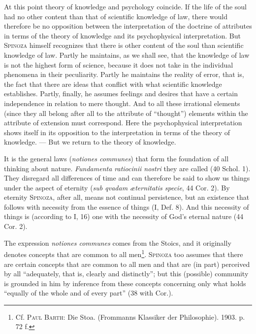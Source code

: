 \documentclass[12pt]{article}
\newcommand{\opage}[1]{\marginnote{\footnotesize\textit{[#1]}}}
\begin{document}
At this point theory of knowledge and psychology coincide. If the life of the soul had no
other content than that of scientific knowledge of law, there would therefore be no
opposition between the interpretation of the doctrine of attributes in terms of the theory
of knowledge and its psychophysical interpretation. But \textsc{Spinoza} himself recognizes
that there is other content of the soul than scientific knowledge of law. Partly he
maintains, as we shall see, that the knowledge of law is not the highest form of science,
because it does not \opage{48}take in the individual phenomena in their peculiarity. Partly
he maintains the reality of error, that is, the fact that there are ideas that conflict
with what scientific knowledge establishes. Partly, finally, he assumes feelings and desires
that have a certain independence in relation to mere thought. And to all these irrational
elements (since they all belong after all to the attribute of ``thought'') elements within
the attribute of extension must correspond. Here the psychophysical interpretation shows
itself in its opposition to the interpretation in terms of the theory of knowledge. --- But
we return to the theory of knowledge.

It is the general laws (\textit{notiones communes}) that form the foundation of all thinking
about nature. \textit{Fundamenta ratiocinii nostri} they are called (40 Schol. 1). They
disregard all differences of time and can therefore be said to show us things under the
aspect of eternity (\textit{sub qvadam æternitatis specie}, 44 Cor. 2). By eternity
\textsc{Spinoza}, after all, means not continual persistence, but an existence that follows
with necessity from the essence of things (I, Def. 8). And this necessity of things is
(according to I, 16) one with the necessity of God's eternal nature (44 Cor. 2).

The expression \textit{notiones communes} comes from the Stoics, and it originally denotes
concepts that are common to all men\footnote{Cf. \textsc{Paul Barth}: Die Stoa.
(Frommanns Klassiker der Philosophie). 1903. p. 72 f.}. \textsc{Spinoza} too assumes that
there are certain concepts that are common to all men and that are (in part) perceived by
all ``adequately, that is, clearly and distinctly''; but this (possible) community is
grounded in him by inference from these concepts concerning only what holds ``equally of the
whole and of every part'' (38 with Cor.).
\end{document}
